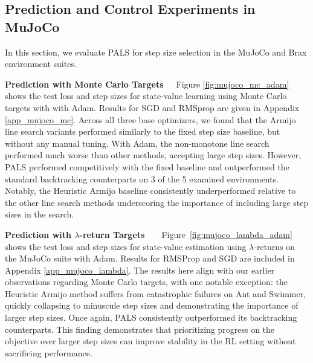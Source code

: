 \documentclass{article}
\begin{document}
\subsection{Prediction and Control Experiments in MuJoCo}

In this section, we evaluate PALS for step size selection in the MuJoCo and Brax environment suites.

\textbf{Prediction with Monte Carlo Targets}\ \ \
Figure \ref{fig:mujoco_mc_adam} shows the test loss and step sizes for state-value learning using Monte Carlo targets with with Adam. Results for SGD and RMSprop are given in Appendix \ref{app_mujoco_mc}. Across all three base optimizers, we found that the Armijo line search variants performed similarly to the fixed step size baseline, but without any manual tuning. 
With Adam, the non-monotone line search performed much worse than other methods, accepting large step sizes. 
However, PALS performed competitively with the fixed baseline and outperformed the standard backtracking counterparts on 3 of the 5 examined environments.  
Notably, the Heuristic Armijo baseline consistently underperformed relative to the other line search methods underscoring the importance of including large step sizes in the search.


\textbf{Prediction with $\lambda$-return Targets}\ \ \ \
Figure~\ref{fig:mujoco_lambda_adam} shows the test loss and step sizes for state-value estimation using $\lambda$-returns 
on the MuJoCo suite with Adam. Results for RMSProp and SGD are included in Appendix \ref{app_mujoco_lambda}. The results here align with our earlier observations regarding Monte Carlo targets, with one notable exception: the Heuristic Armijo method suffers from catastrophic failures on Ant and Swimmer, quickly collapsing to minuscule step sizes and demonstrating the importance of larger step sizes.
Once again, PALS consistently outperformed its backtracking counterparts. This finding demonstrates that prioritizing progress on the objective over larger step sizes can improve stability in the RL setting without sacrificing performance.
\end{document}
